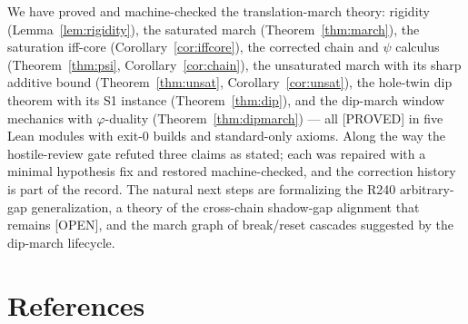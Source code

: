 \documentclass[11pt,a4paper]{article}
\theoremstyle{definition}
\begin{document}
We have proved and machine-checked the translation-march theory:
rigidity (Lemma~\ref{lem:rigidity}), the saturated march
(Theorem~\ref{thm:march}), the saturation iff-core
(Corollary~\ref{cor:iffcore}), the corrected chain and $\psi$
calculus (Theorem~\ref{thm:psi}, Corollary~\ref{cor:chain}), the
unsaturated march with its sharp additive bound
(Theorem~\ref{thm:unsat}, Corollary~\ref{cor:unsat}), the hole-twin
dip theorem with its S1 instance (Theorem~\ref{thm:dip}), and the
dip-march window mechanics with $\varphi$-duality
(Theorem~\ref{thm:dipmarch}) --- all [PROVED] in five Lean modules
with exit-0 builds and standard-only axioms. Along the way the
hostile-review gate refuted three claims as stated; each was repaired
with a minimal hypothesis fix and restored machine-checked, and the
correction history is part of the record. The natural next steps are
formalizing the R240 arbitrary-gap generalization, a theory of the
cross-chain shadow-gap alignment that remains [OPEN], and the march
graph of break/reset cascades suggested by the dip-march lifecycle.

\section{References}
\end{document}
